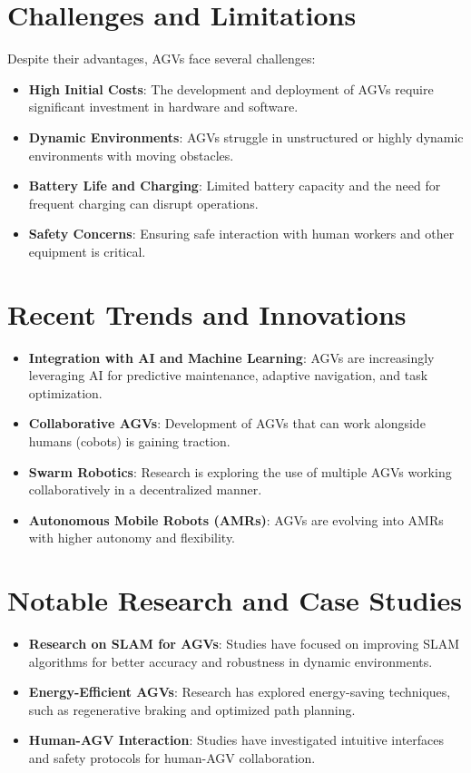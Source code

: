 \documentclass[main]{subfiles}
\begin{document}
\section{Challenges and Limitations}
Despite their advantages, AGVs face several challenges:
\begin{itemize}
    \item \textbf{High Initial Costs}: The development and deployment of AGVs require significant investment in hardware and software.
    \item \textbf{Dynamic Environments}: AGVs struggle in unstructured or highly dynamic environments with moving obstacles.
    \item \textbf{Battery Life and Charging}: Limited battery capacity and the need for frequent charging can disrupt operations.
    \item \textbf{Safety Concerns}: Ensuring safe interaction with human workers and other equipment is critical.
\end{itemize}

\section{Recent Trends and Innovations}
\begin{itemize}
    \item \textbf{Integration with AI and Machine Learning}: AGVs are increasingly leveraging AI for predictive maintenance, adaptive navigation, and task optimization.
    \item \textbf{Collaborative AGVs}: Development of AGVs that can work alongside humans (cobots) is gaining traction.
    \item \textbf{Swarm Robotics}: Research is exploring the use of multiple AGVs working collaboratively in a decentralized manner.
    \item \textbf{Autonomous Mobile Robots (AMRs)}: AGVs are evolving into AMRs with higher autonomy and flexibility.
\end{itemize}

\section{Notable Research and Case Studies}
\begin{itemize}
    \item \textbf{Research on SLAM for AGVs}: Studies have focused on improving SLAM algorithms for better accuracy and robustness in dynamic environments.
    \item \textbf{Energy-Efficient AGVs}: Research has explored energy-saving techniques, such as regenerative braking and optimized path planning.
    \item \textbf{Human-AGV Interaction}: Studies have investigated intuitive interfaces and safety protocols for human-AGV collaboration.
\end{itemize}
\end{document}

